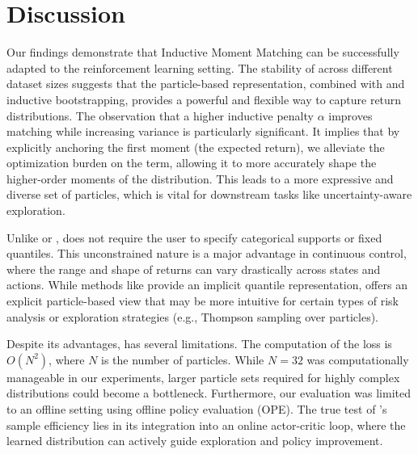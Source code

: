 \section{Discussion}

 Our findings demonstrate that Inductive Moment Matching can be successfully adapted to the reinforcement learning setting. The stability of \immq across different dataset sizes suggests that the particle-based representation, combined with \mmd and inductive bootstrapping, provides a powerful and flexible way to capture return distributions. The observation that a higher inductive penalty $\alpha$ improves \mmd matching while increasing variance is particularly significant. It implies that by explicitly anchoring the first moment (the expected return), we alleviate the optimization burden on the \mmd term, allowing it to more accurately shape the higher-order moments of the distribution. This leads to a more expressive and diverse set of particles, which is vital for downstream tasks like uncertainty-aware exploration.

 Unlike \cfiftyone or \qrdqn, \immq does not require the user to specify categorical supports or fixed quantiles. This unconstrained nature is a major advantage in continuous control, where the range and shape of returns can vary drastically across states and actions. While methods like \iqn provide an implicit quantile representation, \immq offers an explicit particle-based view that may be more intuitive for certain types of risk analysis or exploration strategies (e.g., Thompson sampling over particles).

 Despite its advantages, \immq has several limitations. The computation of the \mmd loss is $O(N^2)$, where $N$ is the number of particles. While $N=32$ was computationally manageable in our experiments, larger particle sets required for highly complex distributions could become a bottleneck. Furthermore, our evaluation was limited to an offline setting using offline policy evaluation (OPE). The true test of \immq's sample efficiency lies in its integration into an online actor-critic loop, where the learned distribution can actively guide exploration and policy improvement.
